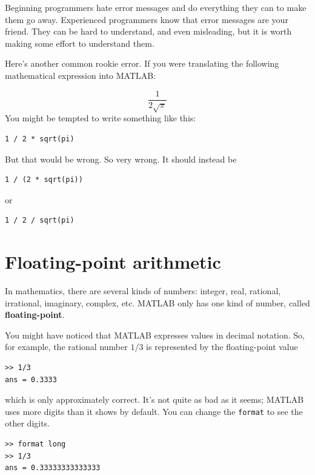 \documentclass{book}
\begin{document}
Beginning programmers hate error messages and do everything they
can to make them go away.  Experienced programmers know that error
messages are your friend.  They can be hard to understand, and even
misleading, but it is worth making some effort to understand them.

Here's another common rookie error.  If you were translating
the following mathematical
expression into MATLAB:

\begin{equation}
 \frac{1}{2 \sqrt \pi}
\end{equation}
You might be tempted to write something like this:

\begin{verbatim}
1 / 2 * sqrt(pi)
\end{verbatim}

But that would be wrong.  So very wrong.  It should instead be

\begin{verbatim}
1 / (2 * sqrt(pi))
\end{verbatim}

or 

\begin{verbatim}
1 / 2 / sqrt(pi)
\end{verbatim}


\section{Floating-point arithmetic}

In mathematics, there are several kinds of numbers: integer, real,
rational, irrational, imaginary, complex, etc.  MATLAB only has one
kind of number, called {\bf floating-point}.

You might have noticed that MATLAB expresses values in decimal
notation.  So, for example, the rational number $1/3$ is represented
by the floating-point value

\begin{verbatim}
>> 1/3
ans = 0.3333
\end{verbatim}

which is only approximately correct.  It's not quite as bad as
it seems; MATLAB uses more digits than it shows by default.
You can change the {\tt format} to see the other digits.

\begin{verbatim}
>> format long
>> 1/3
ans = 0.33333333333333
\end{verbatim}
\end{document}
